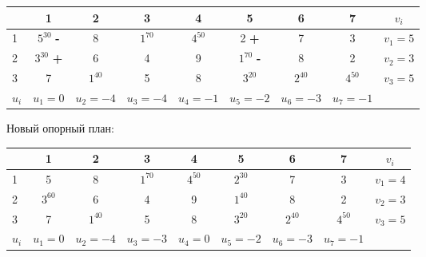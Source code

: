 \begin{center}
    \begin{tabular}{|a | c | c | c | c | c | c | c | c|} 
         \hline
            & 1 & 2 & 3 & 4 & 5 & 6 & 7 & $v_{i}$\\
          &  $5^{30}$ {\bf-}  & 8 &  $1^{70}$ &  $4^{50}$ & 2 {\bf+} & 7 & 3 & {\small$v_1 = 5$}\\
          &  $3^{30}$ {\bf+}  & 6 & 4 & 9 &  $1^{70}$ {\bf-} & 8 & 2 & {\small$v_2 = 3$}\\
          & 7 &  $1^{40}$ & 5 & 8 &  $3^{20}$ &  $2^{40}$ &  $4^{50}$ & {\small$v_3 = 5$}\\
         \hline
            $u_{i}$ & {\small$u_1 = 0$} & {\small$u_2 = -4$} & {\small$u_3 = -4$} & {\small$u_4 = -1$} & {\small$u_5 = -2$} & {\small$u_6 = -3$} & {\small$u_7 = -1$} & \\
        \hline
    \end{tabular}
\end{center}

Новый опорный план:
\begin{center}
    \begin{tabular}{|a | c | c | c | c | c | c | c | c|} 
         \hline
            & 1 & 2 & 3 & 4 & 5 & 6 & 7 & $v_{i}$\\
          & 5  & 8 &  $1^{70}$ &  $4^{50}$ &  $2^{30}$ & 7 & 3 & {\small$v_1 = 4$}\\
          &  $3^{60}$ & 6 & 4 & 9 &  $1^{40}$ & 8 & 2 & {\small$v_2 = 3$}\\
          & 7 &  $1^{40}$ & 5 & 8 &  $3^{20}$ &  $2^{40}$ &  $4^{50}$ & {\small$v_3 = 5$}\\
         \hline
            $u_{i}$ & {\small$u_1 = 0$} & {\small$u_2 = -4$} & {\small$u_3 = -3$} & {\small$u_4 = 0$} & {\small$u_5 = -2$} & {\small$u_6 = -3$} & {\small$u_7 = -1$} & \\
        \hline
    \end{tabular}
\end{center}

